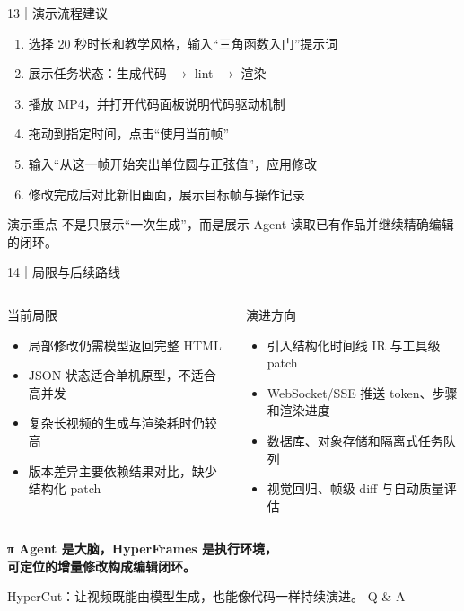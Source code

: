 \documentclass[aspectratio=169,UTF8,11pt]{ctexbeamer}
\begin{document}
\begin{frame}{13｜演示流程建议}
  \begin{enumerate}
    \item 选择 20 秒时长和教学风格，输入“三角函数入门”提示词
    \item 展示任务状态：生成代码 $\rightarrow$ lint $\rightarrow$ 渲染
    \item 播放 MP4，并打开代码面板说明代码驱动机制
    \item 拖动到指定时间，点击“使用当前帧”
    \item 输入“从这一帧开始突出单位圆与正弦值”，应用修改
    \item 修改完成后对比新旧画面，展示目标帧与操作记录
  \end{enumerate}
  \vspace{0.35cm}
  \begin{block}{演示重点}
    不是只展示“一次生成”，而是展示 Agent 读取已有作品并继续精确编辑的闭环。
  \end{block}
\end{frame}

\begin{frame}{14｜局限与后续路线}
  \begin{columns}[T,onlytextwidth]
      \begin{block}{当前局限}
        \begin{itemize}
          \item 局部修改仍需模型返回完整 HTML
          \item JSON 状态适合单机原型，不适合高并发
          \item 复杂长视频的生成与渲染耗时仍较高
          \item 版本差异主要依赖结果对比，缺少结构化 patch
        \end{itemize}
      \end{block}
      \begin{block}{演进方向}
        \begin{itemize}
          \item 引入结构化时间线 IR 与工具级 patch
          \item WebSocket/SSE 推送 token、步骤和渲染进度
          \item 数据库、对象存储和隔离式任务队列
          \item 视觉回归、帧级 diff 与自动质量评估
        \end{itemize}
      \end{block}
  \end{columns}
\end{frame}

{
\begin{frame}[plain]
  \centering
  \vfill
  {\color{hclime}\LARGE\bfseries π Agent 是大脑，HyperFrames 是执行环境，\\[2mm]可定位的增量修改构成编辑闭环。}
  \vspace{0.8cm}

  {\color{white}\large HyperCut：让视频既能由模型生成，也能像代码一样持续演进。}
  \vfill
  {\color{gray}\small Q \& A}
\end{frame}}
\end{document}
